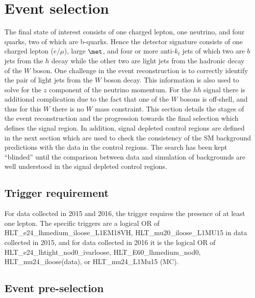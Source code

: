 \section{Event selection}
\label{sec:dihiggs_selection}

The final state of interest consists of one charged lepton, one neutrino, 
and four quarks, two of which are b-quarks. Hence the detector signature
consists of one  charged lepton ($e$/$\mu$), large $\met$, and four or more
anti-$k_t$ jets of which two are $b$ jets from the $h$ decay while the other
two are light jets from the hadronic decay of the $W$ boson. One challenge
in the event reconstruction is to correctly identify the pair of light jets
from the $W$ boson decay. This information is also used to solve for the $z$
component of the neutrino momentum. For the $hh$ signal there is additional
complication due to the fact that one of the 
$W$ bosons is off-shell, and thus for this $W$ there is no $W$ mass constraint. 
This section details the stages of the event reconstruction and the
progression towards the final selection which defines the signal
region.  In addition, signal depleted control regions are defined in the
next section which are used to check the consistency of the SM background
predictions with the data in the control regions. The search
has been kept ``blinded'' until the comparison between data and
simulation of backgrounds are well understood in the signal depleted
control regions.

\subsection{Trigger requirement}

For data collected in 2015 and 2016, the trigger requires the presence of at least one lepton. 
The specific triggers are a logical OR of HLT\_e24\_lhmedium\_iloose\_L1EM18VH, HLT\_mu20\_iloose\_L1MU15 in data collected in 2015, and for data collected in 2016 it is the logical OR of HLT\_e24\_lhtight\_nod0\_ivarloose, HLT\_E60\_lhmedium\_nod0, HLT\_mu24\_iloose(data), or HLT\_mu24\_L1Mu15 (MC).


\subsection{Event pre-selection}

